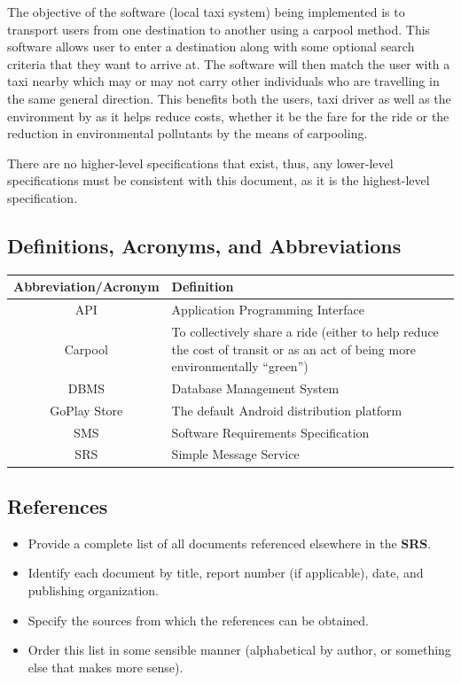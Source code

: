 \documentclass[]{article}
\begin{document}
The objective of the software (local taxi system) being implemented is to transport users from one destination to another using a carpool method. This software allows user to enter a destination along with some optional search criteria that they want to arrive at. The software will then match the user with a taxi nearby which may or may not carry other individuals who are travelling in the same general direction. This benefits both the users, taxi driver as well as the environment by as it helps reduce costs, whether it be the fare for the ride or the reduction in environmental pollutants by the means of carpooling.

There are no higher-level specifications that exist, thus, any lower-level specifications must be consistent with this document, as it is the highest-level specification.

\subsection{Definitions, Acronyms, and Abbreviations}
\label{sub:definitions_acronyms_and_abbreviations}
\begin{center} \begin{tabular} {|c|p{35em}|}
	\hline
	\textbf{Abbreviation/Acronym} & \textbf{Definition} \\
	\hline \hline
	API & Application Programming Interface \\
	\hline
	Carpool & To collectively share a ride (either to help reduce the cost of transit or as an act of being more environmentally “green”) \\
	\hline
	DBMS & Database Management System \\
	\hline
	GoPlay Store & The default Android distribution platform \\
	\hline
	SMS & Software Requirements Specification \\
	\hline
	SRS & Simple Message Service \\
	\hline
\end{tabular} \end{center}

\subsection{References}
\label{sub:references}
\begin{itemize}
	\item Provide a complete list of all documents referenced elsewhere in the \textbf{SRS}.
	\item Identify each document by title, report number (if applicable), date, and publishing organization.
	\item Specify the sources from which the references can be obtained.
	\item Order this list in some sensible manner (alphabetical by author, or something else that makes more sense).
\end{itemize}
\end{document}
